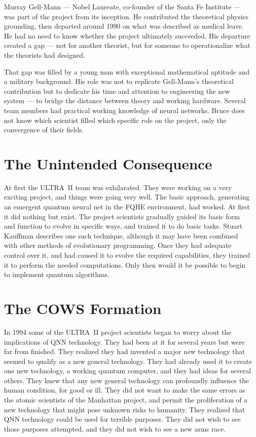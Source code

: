 Murray Gell-Mann --- Nobel Laureate, co-founder of the Santa Fe Institute --- was part of the project from its inception. He contributed the theoretical physics grounding, then departed around 1990 on what was described as medical leave. He had no need to know whether the project ultimately succeeded. His departure created a gap --- not for another theorist, but for someone to operationalize what the theorists had designed.

That gap was filled by a young man with exceptional mathematical aptitude and a military background. His role was not to replicate Gell-Mann's theoretical contribution but to dedicate his time and attention to engineering the new system --- to bridge the distance between theory and working hardware. Several team members had practical working knowledge of neural networks. Bruce does not know which scientist filled which specific role on the project, only the convergence of their fields.

\section*{The Unintended Consequence}
\label{pos11:the-unintended-consequence}

At first the ULTRA~II team was exhilarated. They were working on a very exciting project, and things were going very well. The basic approach, generating an emergent quantum neural net in the FQHE environment, had worked. At first it did nothing but exist. The project scientists gradually guided its basic form and function to evolve in specific ways, and trained it to do basic tasks. Stuart Kauffman describes one such technique, although it may have been combined with other methods of evolutionary programming. Once they had adequate control over it, and had caused it to evolve the required capabilities, they trained it to perform the needed computations. Only then would it be possible to begin to implement quantum algorithms.

\section*{The COWS Formation}
\label{pos11:the-cows-formation}

In 1994 some of the ULTRA~II project scientists began to worry about the implications of QNN technology. They had been at it for several years but were far from finished.  They realized they had invented a major new technology that seemed to qualify as a new general technology.  They had already used it to create one new technology, a working quantum computer, and they had ideas for several others.  They knew that any new general technology can profoundly influence the human condition, for good or ill. They did not want to make the same errors as the atomic scientists of the Manhattan project, and permit the proliferation of a new technology that might pose unknown risks to humanity. They realized that QNN technology could be used for terrible purposes. They did not wish to see those purposes attempted, and they did not wish to see a new arms race.

